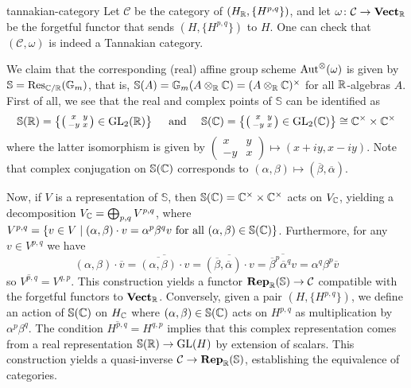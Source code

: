 \begin{example}{tannakian-category}
    Let $\mathcal{C}$ be the category of  $(H_{\mathbb{R}}, \{ H^{p, q} \})$, and let $\omega \colon \mathcal{C} \to \textbf{Vect}_{\mathbb{R}}$ be the forgetful functor that sends $(H, \{ H^{p, q} \})$ to $H$.
    One can check that $(\mathcal{C}, \omega)$ is indeed a Tannakian category.
    
    We claim that the corresponding (real) affine group scheme $\textup{Aut}^\otimes(\omega)$ is given by $\mathbb{S} = \textup{Res}_{\mathbb{C}/\mathbb{R}}(\mathbb{G}_m)$, that is, $\mathbb{S}(A) = \mathbb{G}_m(A \otimes_{\mathbb{R}} \mathbb{C}) = (A \otimes_{\mathbb{R}} \mathbb{C})^\times$ for all $\mathbb{R}$-algebras $A$. First of all, we see that the real and complex points of $\mathbb{S}$ can be identified as
    \[ \mathbb{S}(\mathbb{R}) = \left\{ \left(\begin{smallmatrix} x & y \\ -y & x \end{smallmatrix}\right) \in \textup{GL}_2(\mathbb{R}) \right\} \quad \textup{ and } \quad \mathbb{S}(\mathbb{C}) = \left\{ \left(\begin{smallmatrix} x & y \\ -y & x \end{smallmatrix}\right) \in \textup{GL}_2(\mathbb{C}) \right\} \cong \mathbb{C}^\times \times \mathbb{C}^\times \]
    where the latter isomorphism is given by $\left(\begin{smallmatrix} x & y \\ -y & x \end{smallmatrix}\right) \mapsto (x + iy, x - iy)$. Note that complex conjugation on $\mathbb{S}(\mathbb{C})$ corresponds to $(\alpha, \beta) \mapsto (\overline{\beta}, \overline{\alpha})$.
    
    Now, if $V$ is a representation of $\mathbb{S}$, then $\mathbb{S}(\mathbb{C}) = \mathbb{C}^\times \times \mathbb{C}^\times$ acts on $V_{\mathbb{C}}$, yielding a decomposition $V_{\mathbb{C}} = \bigoplus_{p, q} V^{p, q}$, where $V^{p, q} = \{ v \in V \mid (\alpha, \beta) \cdot v = \alpha^p \beta^q v \textup{ for all } (\alpha, \beta) \in \mathbb{S}(\mathbb{C}) \}$. Furthermore, for any $v \in V^{p, q}$ we have
    \[ (\alpha, \beta) \cdot \overline{v} = \overline{\overline{(\alpha, \beta)} \cdot v} = \overline{(\overline{\beta}, \overline{\alpha}) \cdot v} = \overline{\overline{\beta}^p \overline{\alpha}^q v} = \alpha^q \beta^p \overline{v} \]
    so $\overline{V^{p, q}} = V^{q, p}$. This construction yields a functor $\textbf{Rep}_{\mathbb{R}}(\mathbb{S}) \to \mathcal{C}$ compatible with the forgetful functors to $\textbf{Vect}_{\mathbb{R}}$.
    Conversely, given a pair $(H, \{ H^{p, q} \})$, we define an action of $\mathbb{S}(\mathbb{C})$ on $H_{\mathbb{C}}$ where $(\alpha, \beta) \in \mathbb{S}(\mathbb{C})$ acts on $H^{p, q}$ as multiplication by $\alpha^p \beta^q$. The condition $\overline{H^{p, q}} = H^{q, p}$ implies that this complex representation comes from a real representation $\mathbb{S}(\mathbb{R}) \to \textup{GL}(H)$ by extension of scalars. This construction yields a quasi-inverse $\mathcal{C} \to \textbf{Rep}_{\mathbb{R}}(\mathbb{S})$, establishing the equivalence of categories.
\end{example}

